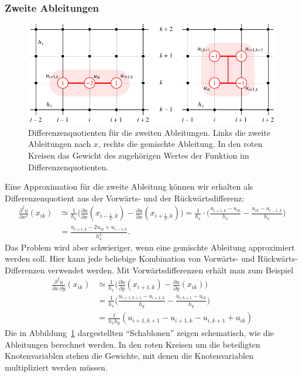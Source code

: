 \subsubsection{Zweite Ableitungen}
\begin{figure}
\centering
\includegraphics{chapters/70-pde/images/diff2.pdf}
\caption{Differenzenquotienten für die zweiten Ableitungen.
Links die zweite Ableitungen nach $x$, rechts die gemischte Ableitung.
In den roten Kreisen das Gewicht des zugehörigen Wertes der Funktion
im Differenzenquotienten.
\label{buch:pde:diff2}}
\end{figure}
Eine Approximation für die zweite Ableitung können wir erhalten als
Differenzenquotient aus der Vorwärts- und der Rückwärtsdifferenz:
\begin{align*}
\frac{\partial^2 u}{\partial x^2}(x_{ik})
&\simeq
\frac{1}{h_x}\biggl(
\frac{\partial u}{\partial x}(x_{i-\frac12,k})
-
\frac{\partial u}{\partial x}(x_{i+\frac12,k})
\biggr)
=
\frac{1}{h_x}
\cdot
\biggl(
\frac{u_{i+1,k}-u_{ik}}{h_x}
-
\frac{u_{ik}-u_{i-1,k}}{h_x}
\biggr)
\\
&=
\frac{u_{i+1,k}-2u_{ik}+u_{i-1,k}}{h_x^2}.
\end{align*}
Das Problem wird aber schwieriger, wenn eine gemischte Ableitung
approximiert werden soll.
Hier kann jede beliebige Kombination von Vorwärts- und Rückwärts-Differenzen
verwendet werden.
Mit Vorwärtsdifferenzen erhält man zum Beispiel
\begin{align*}
\frac{\partial^2u}{\partial x\,\partial y}(x_{ik})
&\simeq
\frac{1}{h_x}\biggl(
\frac{\partial u}{\partial y}(x_{i+1,k})
-
\frac{\partial u}{\partial y}(x_{ik})
\biggr)
\\
&=
\frac{1}{h_x}\biggl(
\frac{u_{i+1,k+1}-u_{i+1,k}}{h_y}
-
\frac{u_{i,k+1}-u_{ik}}{h_y}
\biggr)
\\
&=
\frac{1}{h_xh_y}(
u_{i+1,k+1}-u_{i+1,k}
-
u_{i,k+1}+u_{ik}
)
\end{align*}
Die in Abbildung~\ref{buch:pde:diff2} dargestellten ``Schablonen''
zeigen schematisch, wie die Ableitungen berechnet werden.
In den roten Kreisen um die beteiligten Knotenvariablen stehen die
Gewichte, mit denen die Knotenvariablen multipliziert werden müssen.

